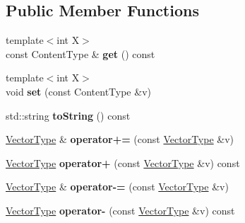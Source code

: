 \subsection*{Public Member Functions}
\begin{DoxyCompactItemize}
\item 
\hypertarget{classsambag_1_1math_1_1_vector_n_abda02c325066115f1c77407bccbe1c2d}{
{\footnotesize template$<$int X$>$ }\\const ContentType \& {\bfseries get} () const }
\label{classsambag_1_1math_1_1_vector_n_abda02c325066115f1c77407bccbe1c2d}

\item 
\hypertarget{classsambag_1_1math_1_1_vector_n_a7aba0d1085d45946da86afb4e985edd0}{
{\footnotesize template$<$int X$>$ }\\void {\bfseries set} (const ContentType \&v)}
\label{classsambag_1_1math_1_1_vector_n_a7aba0d1085d45946da86afb4e985edd0}

\item 
\hypertarget{classsambag_1_1math_1_1_vector_n_a18ac512c7c0722dd3b57a196a3ef20e4}{
std::string {\bfseries toString} () const }
\label{classsambag_1_1math_1_1_vector_n_a18ac512c7c0722dd3b57a196a3ef20e4}

\item 
\hypertarget{classsambag_1_1math_1_1_vector_n_a650abda82f8f03799caba854400ca9a5}{
\hyperlink{classsambag_1_1math_1_1_vector_n}{VectorType} \& {\bfseries operator+=} (const \hyperlink{classsambag_1_1math_1_1_vector_n}{VectorType} \&v)}
\label{classsambag_1_1math_1_1_vector_n_a650abda82f8f03799caba854400ca9a5}

\item 
\hypertarget{classsambag_1_1math_1_1_vector_n_a554c54d14ce54a0098feb4b296e6c301}{
\hyperlink{classsambag_1_1math_1_1_vector_n}{VectorType} {\bfseries operator+} (const \hyperlink{classsambag_1_1math_1_1_vector_n}{VectorType} \&v) const }
\label{classsambag_1_1math_1_1_vector_n_a554c54d14ce54a0098feb4b296e6c301}

\item 
\hypertarget{classsambag_1_1math_1_1_vector_n_a0c20b497a0b6bbfa8a7cd827009875da}{
\hyperlink{classsambag_1_1math_1_1_vector_n}{VectorType} \& {\bfseries operator-\/=} (const \hyperlink{classsambag_1_1math_1_1_vector_n}{VectorType} \&v)}
\label{classsambag_1_1math_1_1_vector_n_a0c20b497a0b6bbfa8a7cd827009875da}

\item 
\hypertarget{classsambag_1_1math_1_1_vector_n_ab94ef2f67ceda097f0ff9a50c6d7e02d}{
\hyperlink{classsambag_1_1math_1_1_vector_n}{VectorType} {\bfseries operator-\/} (const \hyperlink{classsambag_1_1math_1_1_vector_n}{VectorType} \&v) const }
\label{classsambag_1_1math_1_1_vector_n_ab94ef2f67ceda097f0ff9a50c6d7e02d}


\end{DoxyCompactItemize}

